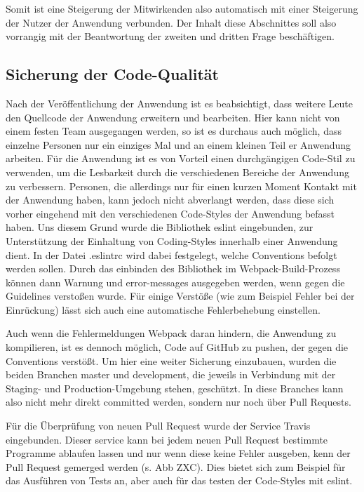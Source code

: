 Somit ist eine Steigerung der Mitwirkenden also automatisch mit einer Steigerung der Nutzer der Anwendung verbunden. Der Inhalt diese Abschnittes soll also vorrangig mit der Beantwortung der zweiten und dritten Frage beschäftigen.

\subsection{Sicherung der Code-Qualität}
Nach der Veröffentlichung der Anwendung ist es beabsichtigt, dass weitere Leute den Quellcode der Anwendung erweitern und bearbeiten. Hier kann nicht von einem festen Team ausgegangen werden, so ist es durchaus auch möglich, dass einzelne Personen nur ein einziges Mal und an einem kleinen Teil er Anwendung arbeiten. Für die Anwendung ist es von Vorteil einen durchgängigen Code-Stil zu verwenden, um die Lesbarkeit durch die verschiedenen Bereiche der Anwendung zu verbessern. Personen, die allerdings nur für einen kurzen Moment Kontakt mit der Anwendung haben, kann  jedoch nicht abverlangt werden, dass diese sich vorher eingehend mit den verschiedenen Code-Styles der Anwendung befasst haben. Uns diesem Grund wurde die Bibliothek eslint eingebunden, zur Unterstützung der Einhaltung von Coding-Styles innerhalb einer Anwendung dient.
In der Datei .eslintrc wird dabei festgelegt, welche Conventions befolgt werden sollen. Durch das einbinden des Bibliothek im Webpack-Build-Prozess können dann Warnung und error-messages ausgegeben werden, wenn gegen die Guidelines verstoßen wurde. Für einige Verstöße (wie zum Beispiel Fehler bei der Einrückung) lässt sich auch eine automatische  Fehlerbehebung einstellen.

Auch wenn die Fehlermeldungen Webpack daran hindern, die Anwendung zu kompilieren, ist es dennoch möglich, Code auf GitHub zu pushen, der gegen die Conventions verstößt. Um hier eine weiter Sicherung einzubauen, wurden die beiden Branchen master und development, die jeweils in Verbindung mit der Staging- und Production-Umgebung stehen, geschützt. In diese Branches kann also nicht mehr direkt committed werden, sondern nur noch über Pull Requests.

Für die Überprüfung von neuen Pull Request wurde der Service Travis eingebunden. Dieser service kann bei jedem neuen Pull Request bestimmte Programme ablaufen lassen und nur wenn diese keine Fehler ausgeben, kenn der Pull Request gemerged werden (s. Abb ZXC). Dies bietet sich zum Beispiel für das Ausführen von Tests an, aber auch für das testen der Code-Styles mit eslint.

